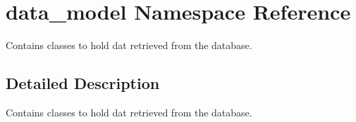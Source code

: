 \hypertarget{namespacedata__model}{}\section{data\+\_\+model Namespace Reference}
\label{namespacedata__model}


Contains classes to hold dat retrieved from the database.  




\subsection{Detailed Description}
Contains classes to hold dat retrieved from the database. 